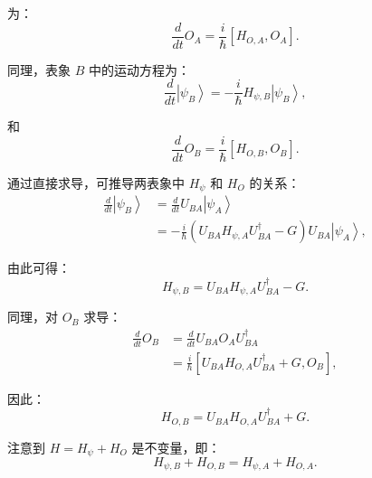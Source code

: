  为：
\begin{equation}
	\frac{d}{dt} O_A = \frac{i}{\hbar} \left[ H_{O,A}, O_A \right].
\end{equation}

同理，表象 $ B $ 中的运动方程为：
\begin{equation}
	\frac{d}{dt} \left|\psi_B\right\rangle = -\frac{i}{\hbar} H_{\psi,B} \left|\psi_B\right\rangle,
\end{equation}

和
\begin{equation}
	\frac{d}{dt} O_B = \frac{i}{\hbar} \left[ H_{O,B}, O_B \right].
\end{equation}

通过直接求导，可推导两表象中 $ H_\psi $ 和 $ H_O $ 的关系：
\begin{equation}
	\begin{aligned}
		\frac{d}{dt} \left|\psi_B\right\rangle &= \frac{d}{dt} U_{BA} \left|\psi_A\right\rangle \\
		&= -\frac{i}{\hbar} \left( U_{BA} H_{\psi,A} U_{BA}^\dagger - G \right) U_{BA} \left|\psi_A\right\rangle,
	\end{aligned}
\end{equation}

由此可得：
\begin{equation}
	H_{\psi,B} = U_{BA} H_{\psi,A} U_{BA}^\dagger - G.
\end{equation}

同理，对 $ O_B $ 求导：
\begin{equation}
	\begin{aligned}
		\frac{d}{dt} O_B &= \frac{d}{dt} U_{BA} O_A U_{BA}^\dagger \\
		&= \frac{i}{\hbar} \left[ U_{BA} H_{O,A} U_{BA}^\dagger + G, O_B \right],
	\end{aligned}
\end{equation}

因此：
\begin{equation}
	H_{O,B} = U_{BA} H_{O,A} U_{BA}^\dagger + G.
\end{equation}

注意到 $ H = H_\psi + H_O $ 是不变量，即：
\begin{equation}
	H_{\psi,B} + H_{O,B} = H_{\psi,A} + H_{O,A}.
\end{equation}

\begin{center}
\end{center}


